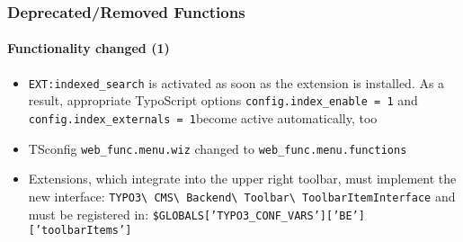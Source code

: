\begin{frame}[fragile]
	\frametitle{Deprecated/Removed Functions}
	\framesubtitle{Functionality changed (1)}

	\begin{itemize}

		\item \texttt{EXT:indexed\_search} is activated as soon as the extension is installed.
			As a result, appropriate TypoScript options \small\texttt{config.index\_enable = 1}\normalsize
			and \small\texttt{config.index\_externals = 1}\normalsize become active automatically, too

		\item TSconfig \small\texttt{web\_func.menu.wiz}\normalsize\space
			changed to \small\texttt{web\_func.menu.functions}\normalsize

		\item Extensions, which integrate into the upper right toolbar, must implement the new interface:
			\small
				\texttt{TYPO3\textbackslash
					CMS\textbackslash
					Backend\textbackslash
					Toolbar\textbackslash
					ToolbarItemInterface}
			\normalsize\newline
			and must be registered in:
			\small
				\texttt{\$GLOBALS['TYPO3\_CONF\_VARS']['BE']['toolbarItems']}
			\normalsize

	\end{itemize}

\end{frame}


